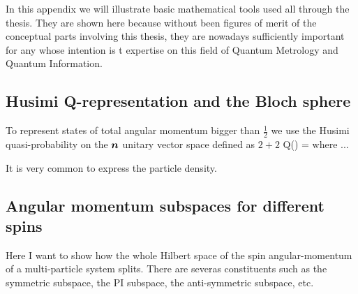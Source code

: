 In this appendix we will illustrate basic mathematical tools used all through the thesis.
They are shown here because without been figures of merit of the conceptual parts involving this thesis, they are nowadays sufficiently important for any whose intention is t expertise on this field of Quantum Metrology and Quantum Information.

\subsection{Husimi Q-representation and the Bloch sphere}

To represent states of total angular momentum bigger than $\frac{1}{2}$ we use the Husimi quasi-probability on the $\boldsymbol{n}$ unitary vector space defined as $2+2$
\be
  Q(\alpha) = \braopket{}{\varrho}{\alpha}
\ee
where ...

It is very common to express the particle density.

\subsection{Angular momentum subspaces for different spins}
\label{app:angular-subspaces}

Here I want to show how the whole Hilbert space of the spin angular-momentum of a multi-particle system splits. There are severas constituents such as the symmetric subspace, the PI subspace, the anti-symmetric subspace, etc.
